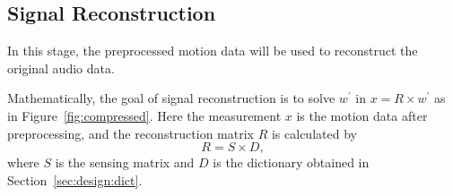 \subsection{Signal Reconstruction}
In this stage, the preprocessed motion data will be used to reconstruct the original audio data.

Mathematically, the goal of signal reconstruction is to solve $w^\prime$ in 
	$x = R \times w^\prime$
as in Figure~\ref{fig:compressed}. Here the measurement $x$ is the motion data after preprocessing, and the reconstruction matrix $R$ is calculated by
\begin{equation}
R = S \times D, \label{eq:reconstruct2}
\end{equation}
where $S$ is the sensing matrix and $D$ is the dictionary obtained in Section~\ref{sec:design:dict}.

